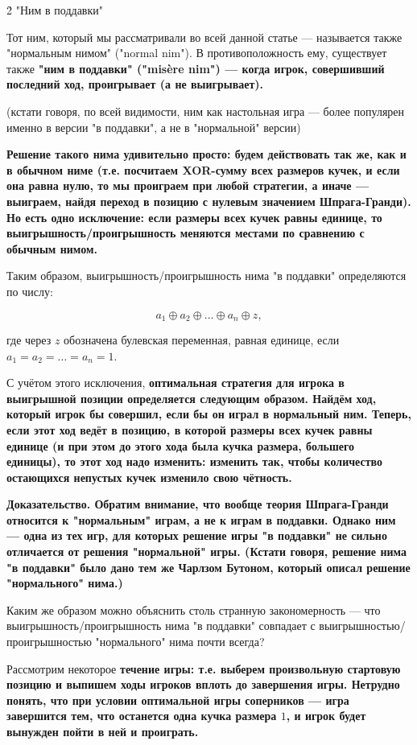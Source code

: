 \h2{ "Ним в поддавки" }

Тот ним, который мы рассматривали во всей данной статье --- называется также "нормальным нимом" ("normal nim"). В противоположность ему, существует также \bf{"ним в поддавки"} ("misère nim") --- когда игрок, совершивший последний ход, проигрывает (а не выигрывает).

(кстати говоря, по всей видимости, ним как настольная игра --- более популярен именно в версии "в поддавки", а не в "нормальной" версии)

\bf{Решение} такого нима удивительно просто: будем действовать так же, как и в обычном ниме (т.е. посчитаем XOR-сумму всех размеров кучек, и если она равна нулю, то мы проиграем при любой стратегии, а иначе --- выиграем, найдя переход в позицию с нулевым значением Шпрага-Гранди). Но есть одно \bf{исключение}: если размеры всех кучек равны единице, то выигрышность/проигрышность меняются местами по сравнению с обычным нимом.

Таким образом, выигрышность/проигрышность нима "в поддавки" определяются по числу:

$$ a_1 \oplus a_2 \oplus \ldots \oplus a_n \oplus z, $$

где через $z$ обозначена булевская переменная, равная единице, если $a_1 = a_2 = \ldots = a_n = 1$.

С учётом этого исключения, \bf{оптимальная стратегия} для игрока в выигрышной позиции определяется следующим образом. Найдём ход, который игрок бы совершил, если бы он играл в нормальный ним. Теперь, если этот ход ведёт в позицию, в которой размеры всех кучек равны единице (и при этом до этого хода была кучка размера, большего единицы), то этот ход надо изменить: изменить так, чтобы количество остающихся непустых кучек изменило свою чётность.

\bf{Доказательство}. Обратим внимание, что вообще теория Шпрага-Гранди относится к "нормальным" играм, а не к играм в поддавки. Однако ним --- одна из тех игр, для которых решение игры "в поддавки" не сильно отличается от решения "нормальной" игры. (Кстати говоря, решение нима "в поддавки" было дано тем же Чарлзом Бутоном, который описал решение "нормального" нима.)

Каким же образом можно объяснить столь странную закономерность --- что выигрышность/проигрышность нима "в поддавки" совпадает с выигрышностью/проигрышностью "нормального" нима почти всегда?

Рассмотрим некоторое \bf{течение игры}: т.е. выберем произвольную стартовую позицию и выпишем ходы игроков вплоть до завершения игры. Нетрудно понять, что при условии оптимальной игры соперников --- игра завершится тем, что останется одна кучка размера $1$, и игрок будет вынужден пойти в ней и проиграть.

